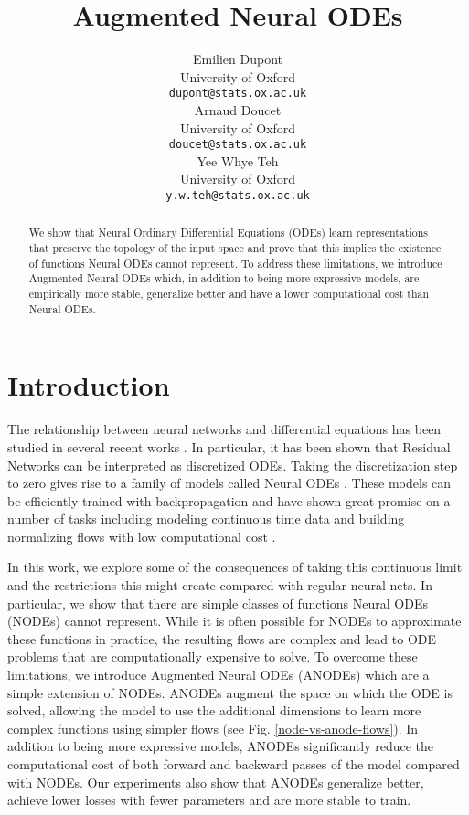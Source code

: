 \documentclass{article}
\title{Augmented Neural ODEs}
\author{Emilien Dupont \\
University of Oxford \\
\texttt{dupont@stats.ox.ac.uk}\\
\And
Arnaud Doucet \\
University of Oxford \\
\texttt{doucet@stats.ox.ac.uk} \\
\And
Yee Whye Teh \\
University of Oxford \\
\texttt{y.w.teh@stats.ox.ac.uk}\\
}
\providecommand{\customgenericname}{}
\newcommand{\newcustomtheorem}[2]{\newenvironment{#1}[1]
  {\renewcommand\customgenericname{#2}\renewcommand\theinnercustomgeneric{##1}\innercustomgeneric
  }
  {\endinnercustomgeneric}
}
\begin{document}
\maketitle

\begin{abstract}
    We show that Neural Ordinary Differential Equations (ODEs) learn representations that preserve the topology of the input space and prove that this implies the existence of functions Neural ODEs cannot represent. To address these limitations, we introduce Augmented Neural ODEs which, in addition to being more expressive models, are empirically more stable, generalize better and have a lower computational cost than Neural ODEs.
\end{abstract}

\newtheorem{prop}{Proposition}
\newtheorem{theorem}{Theorem}
\newtheorem{corollary}{Corollary}
\newtheorem*{prop*}{Proposition}
\newtheorem*{theorem*}{Theorem}
\newtheorem*{corollary*}{Corollary}
\newcustomtheorem{customprop}{Proposition}

\section{Introduction}
The relationship between neural networks and differential equations has been studied in several recent works \citep{weinan2017proposal, lu2017beyond, haber2017stable, ruthotto2018deep, chen2018neural}. In particular, it has been shown that Residual Networks \citep{he2016deep} can be interpreted as discretized ODEs. Taking the discretization step to zero gives rise to a family of models called Neural ODEs \citep{chen2018neural}. These models can be efficiently trained with backpropagation and have shown great promise on a number of tasks including modeling continuous time data and building normalizing flows with low computational cost \citep{chen2018neural,grathwohl2018ffjord}.

In this work, we explore some of the consequences of taking this continuous limit and the restrictions this might create compared with regular neural nets. In particular, we show that there are simple classes of functions Neural ODEs (NODEs) cannot represent. While it is often possible for NODEs to approximate these functions in practice, the resulting flows are complex and lead to ODE problems that are computationally expensive to solve. To overcome these limitations, we introduce Augmented Neural ODEs (ANODEs) which are a simple extension of NODEs. ANODEs augment the space on which the ODE is solved, allowing the model to use the additional dimensions to learn more complex functions using simpler flows (see Fig. \ref{node-vs-anode-flows}). In addition to being more expressive models, ANODEs significantly reduce the computational cost of both forward and backward passes of the model compared with NODEs. Our experiments also show that ANODEs generalize better, achieve lower losses with fewer parameters and are more stable to train.
\end{document}
